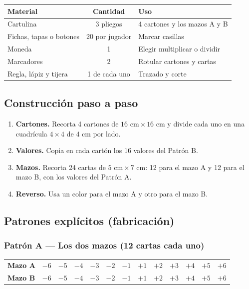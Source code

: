 \documentclass[12pt, letterpaper]{article}
\begin{document}
\begin{center}
\small
\begin{tabular}{@{}p{5.0cm} c p{7.4cm}@{}}
\toprule
\textbf{Material} & \textbf{Cantidad} & \textbf{Uso}\\
\midrule
Cartulina & 3 pliegos & 4 cartones y los mazos A y B\\
Fichas, tapas o botones & 20 por jugador & Marcar casillas\\
Moneda & 1 & Elegir multiplicar o dividir\\
Marcadores & 2 & Rotular cartones y cartas\\
Regla, lápiz y tijera & 1 de cada uno & Trazado y corte\\
\bottomrule
\end{tabular}
\end{center}

\subsection{Construcción paso a paso}

\begin{enumerate}[leftmargin=*]
  \item \textbf{Cartones.} Recorta 4 cartones de $16\text{ cm}\times 16\text{ cm}$ y divide cada uno en una cuadrícula $4\times 4$ de $4\text{ cm}$ por lado.
  \item \textbf{Valores.} Copia en cada cartón los 16 valores del Patrón B.
  \item \textbf{Mazos.} Recorta 24 cartas de $5\text{ cm}\times 7\text{ cm}$: 12 para el mazo A y 12 para el mazo B, con los valores del Patrón A.
  \item \textbf{Reverso.} Usa un color para el mazo A y otro para el mazo B.
\end{enumerate}

\subsection{Patrones explícitos (fabricación)}

\subsubsection{Patrón A — Los dos mazos (12 cartas cada uno)}

\begin{center}
\small
\begin{tabular}{@{}l c c c c c c c c c c c c@{}}
\toprule
\textbf{Mazo A} & $-6$ & $-5$ & $-4$ & $-3$ & $-2$ & $-1$ & $+1$ & $+2$ & $+3$ & $+4$ & $+5$ & $+6$\\
\textbf{Mazo B} & $-6$ & $-5$ & $-4$ & $-3$ & $-2$ & $-1$ & $+1$ & $+2$ & $+3$ & $+4$ & $+5$ & $+6$\\
\bottomrule
\end{tabular}
\end{center}
\end{document}
